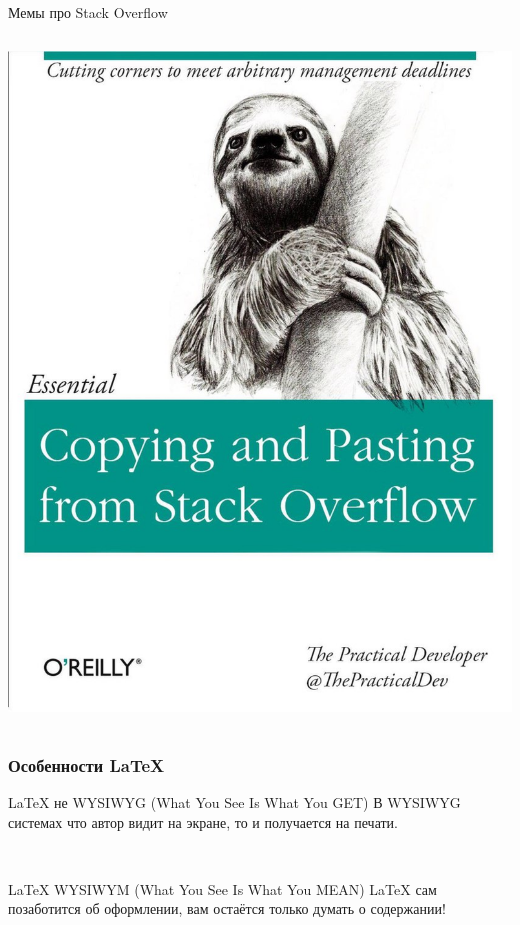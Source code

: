 \documentclass[newPxFont]{beamer}
\begin{document}
\begin{frame}{Мемы про Stack Overflow}
\begin{columns}
\begin{column}{.48\linewidth}
\includegraphics[width=\linewidth]{copypast.jpg}\\	
\end{column}
\end{columns}
\end{frame}


\begin{frame}
\frametitle{Особенности \LaTeX}
\LaTeX{} не WYSIWYG (What You See Is What You GET)
В WYSIWYG системах что автор видит на экране, то и получается на печати.

\mbox{ } 

\LaTeX{} WYSIWYM (What You See Is What You \alert{MEAN})
\LaTeX{} сам позаботится об оформлении, вам остаётся только думать о содержании!
\end{frame}
\end{document}
